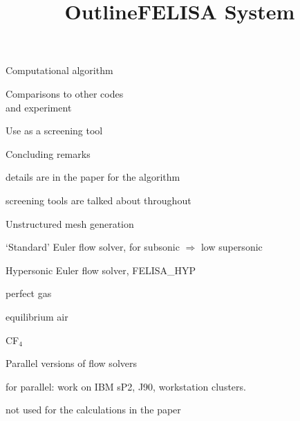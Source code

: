 \documentclass[landscape]{slides}
\begin{document}
\begin{slide}
  \title{Outline}
  \leftmargin 3in
  \begin{items}
    \item Computational algorithm
    \item Comparisons to other codes\\
          and experiment
    \item Use as a screening tool
    \item Concluding remarks
  \end{items}
\end{slide}

\begin{note}
  \begin{items}
     \item details are in the paper for the algorithm
     \item screening tools are talked about throughout
  \end{items}
\end{note}

\begin{slide}
  \title{FELISA System}
  \begin{items} 
    \item Unstructured mesh generation
    \item `Standard' Euler flow solver, 
          for subsonic $\Rightarrow$ low supersonic
    \item Hypersonic Euler flow solver, FELISA\_HYP
          \begin{items}
            \item perfect gas
            \item equilibrium air
            \item CF$_4$
          \end{items}
    \item Parallel versions of flow solvers
  \end{items}
\end{slide}

\begin{note}
  \begin{items}
    \item for parallel:  work on IBM sP2, J90, workstation clusters.
    \item not used for the calculations in the paper
  \end{items}
\end{note}
\end{document}
